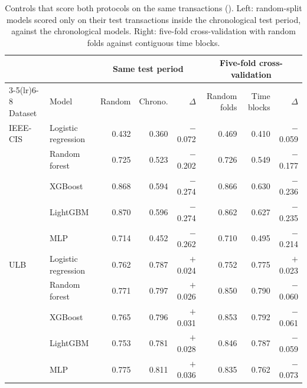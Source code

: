 \begin{table}[htbp]
\caption{Controls that score both protocols on the same transactions (\prauc{}). Left: random-split models scored only on their test transactions inside the chronological test period, against the chronological models. Right: five-fold cross-validation with random folds against contiguous time blocks.}
\label{tab:controls}
\small
\begin{tabular}{llrrrrrr}
\toprule
 & & \multicolumn{3}{c}{Same test period} & \multicolumn{3}{c}{Five-fold cross-validation} \\
\cmidrule(lr){3-5}\cmidrule(lr){6-8}
Dataset & Model & Random & Chrono. & $\Delta$ & Random folds & Time blocks & $\Delta$ \\
\midrule
IEEE-CIS & Logistic regression & 0.432 & 0.360 & $-$0.072 & 0.469 & 0.410 & $-$0.059 \\
 & Random forest & 0.725 & 0.523 & $-$0.202 & 0.726 & 0.549 & $-$0.177 \\
 & XGBoost & 0.868 & 0.594 & $-$0.274 & 0.866 & 0.630 & $-$0.236 \\
 & LightGBM & 0.870 & 0.596 & $-$0.274 & 0.862 & 0.627 & $-$0.235 \\
 & MLP & 0.714 & 0.452 & $-$0.262 & 0.710 & 0.495 & $-$0.214 \\
\addlinespace
ULB & Logistic regression & 0.762 & 0.787 & $+$0.024 & 0.752 & 0.775 & $+$0.023 \\
 & Random forest & 0.771 & 0.797 & $+$0.026 & 0.850 & 0.790 & $-$0.060 \\
 & XGBoost & 0.765 & 0.796 & $+$0.031 & 0.853 & 0.792 & $-$0.061 \\
 & LightGBM & 0.753 & 0.781 & $+$0.028 & 0.846 & 0.787 & $-$0.059 \\
 & MLP & 0.775 & 0.811 & $+$0.036 & 0.835 & 0.762 & $-$0.073 \\
\bottomrule
\end{tabular}
\end{table}
